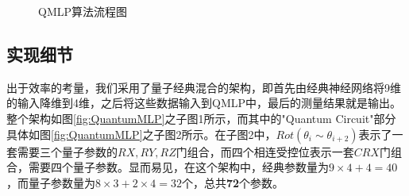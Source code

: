 \documentclass[10pt,a4paper,twoside]{article}
\numberwithin{figure}{section}%
\numberwithin{table}{section}%
\begin{document}
\begin{figure}[tb]
    \centering
    \caption{QMLP算法流程图}
    \label{fig:qmlp_flow_smart}
\end{figure}

\subsection{实现细节}

出于效率的考量，我们采用了量子经典混合的架构，即首先由经典神经网络将9维的输入降维到4维，之后将这些数据输入到QMLP中，最后的测量结果就是输出。整个架构如图\ref{fig:QuantumMLP}之子图1所示，而其中的"Quantum Circuit"部分具体如图\ref{fig:QuantumMLP}之子图2所示。在子图2中，$Rot(\theta_{i}\sim\theta_{i+2})$表示了一套需要三个量子参数的$RX,RY,RZ$门组合，而四个相连受控位表示一套$CRX$门组合，需要四个量子参数。显而易见，在这个架构中，经典参数量为$9\times4+4=40$，而量子参数量为$8\times3+2\times4=32$个，总共\textbf{72}个参数。
\end{document}
